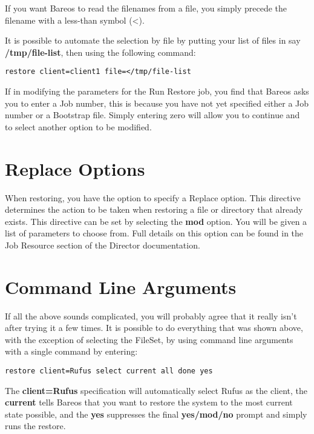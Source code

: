 If you want Bareos to read the filenames from a file, you simply precede the
filename with a less-than symbol ({\textless}).

It is possible to automate the selection by file by putting your list of files
in say {\bf /tmp/file-list}, then using the following command:

\footnotesize
\begin{verbatim}
restore client=client1 file=</tmp/file-list
\end{verbatim}
\normalsize

If in modifying the parameters for the Run Restore job, you find that Bareos
asks you to enter a Job number, this is because you have not yet specified
either a Job number or a Bootstrap file. Simply entering zero will allow you
to continue and to select another option to be modified.

\label{Replace}

\section{Replace Options}

When restoring, you have the option to specify a Replace option.  This
directive determines the action to be taken when restoring a file or
directory that already exists.  This directive can be set by selecting
the {\bf mod} option.  You will be given a list of parameters to choose
from.  Full details on this option can be found in the Job Resource section
of the Director documentation.

\label{CommandArguments}

\section{Command Line Arguments}

If all the above sounds complicated, you will probably agree that it really
isn't after trying it a few times. It is possible to do everything that was
shown above, with the exception of selecting the FileSet, by using command
line arguments with a single command by entering:

\footnotesize
\begin{verbatim}
restore client=Rufus select current all done yes
\end{verbatim}
\normalsize

The {\bf client=Rufus} specification will automatically select Rufus as the
client, the {\bf current} tells Bareos that you want to restore the system to
the most current state possible, and the {\bf yes} suppresses the final {\bf
yes/mod/no} prompt and simply runs the restore.

